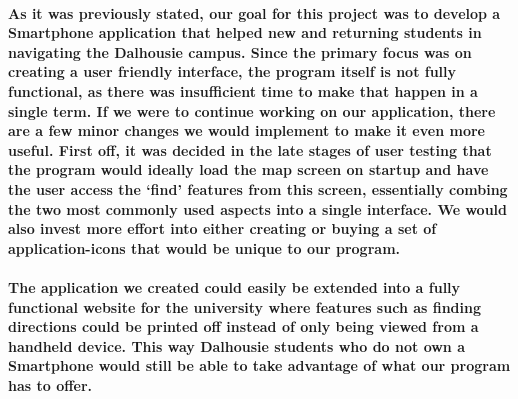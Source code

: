 \documentclass{report}
\begin{document}
    \paragraph{As it was previously stated, our goal for this project was to develop
    a Smartphone application that helped new and returning students in navigating
    the Dalhousie campus. Since the primary focus was on creating a user friendly
    interface, the program itself is not fully functional, as there was insufficient
    time to make that happen in a single term. If we were to continue working on our
    application, there are a few minor changes we would implement to make it even
    more useful. First off, it was decided in the late stages of user testing that
    the program would ideally load the map screen on startup and have the user
    access the ‘find’ features from this screen, essentially combing the two most
    commonly used aspects into a single interface. We would also invest more effort
    into either creating or buying a set of application-icons that would be unique
    to our program.}
    \paragraph{The application we created could easily be extended into a fully
    functional website for the university where features such as finding directions
    could be printed off instead of only being viewed from a handheld device. This
    way Dalhousie students who do not own a Smartphone would still be able to take
    advantage of what our program has to offer.}
\nocite{*}
{}

\end{document}
